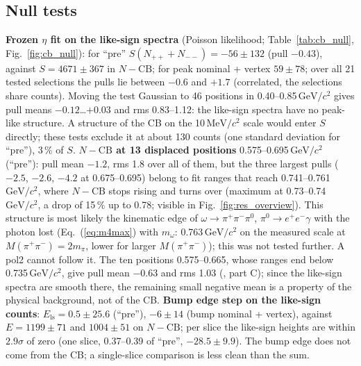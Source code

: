 \documentclass[11pt,a4paper]{article}
\newcommand{\piz}{\ensuremath{\pi^{0}}\xspace}
\newcommand{\ee}{\ensuremath{e^{+}e^{-}}\xspace}
\newcommand{\pipi}{\ensuremath{\pi^{+}\pi^{-}}\xspace}
\newcommand{\Mpipi}{\ensuremath{M(\pi^{+}\pi^{-})}\xspace}
\newcommand{\GeVcc}{\ensuremath{\mathrm{GeV}/c^{2}}\xspace}
\newcommand{\MeVcc}{\ensuremath{\mathrm{MeV}/c^{2}}\xspace}
\newcommand{\code}[1]{\texttt{\detokenize{#1}}}
\begin{document}
\subsection{Null tests}
\label{sec:cbnull}
\textbf{Frozen $\eta$ fit on the like-sign spectra} (Poisson likelihood; Table~\ref{tab:cb_null}, Fig.~\ref{fig:cb_null}):
for ``pre'' $S(N_{++}+N_{--})=-56\pm132$ (pull $-0.43$), against $S=4671\pm367$ in $N-\mathrm{CB}$; for peak nominal + vertex
$59\pm78$; over all 21 tested selections the pulls lie between $-0.6$ and $+1.7$ (correlated, the selections share
counts). Moving the test Gaussian to 46 positions in 0.40--0.85\,\GeVcc gives pull means $-0.12$\dots$+0.03$ and rms
0.83--1.12: the like-sign spectra have no peak-like structure. A structure of the CB on the 10\,\MeVcc scale would
enter $S$ directly; these tests exclude it at about 130 counts (one standard deviation for ``pre''), 3\,\% of $S$.
\textbf{$N-\mathrm{CB}$ at 13 displaced positions} 0.575--0.695\,\GeVcc (``pre''): pull mean $-1.2$, rms 1.8 over all of
them, but the three largest pulls ($-2.5$, $-2.6$, $-4.2$ at 0.675--0.695) belong to fit ranges that reach 0.741--0.761\,\GeVcc,
where $N-\mathrm{CB}$ stops rising and turns over (maximum at 0.73--0.74\,\GeVcc, a drop of 15\,\% up to 0.78; visible in
Fig.~\ref{fig:res_overview}). This structure is most likely the kinematic edge of $\omega\to\pipi\piz$, $\piz\to\ee\gamma$ with
the photon lost (Eq.~(\ref{eq:m4max}) with $m_\omega$: 0.763\,\GeVcc on the measured scale at $\Mpipi=2m_\pi$, lower for larger
\Mpipi); this was not tested further. A pol2 cannot follow it. The ten positions 0.575--0.665, whose ranges end below
0.735\,\GeVcc, give pull mean $-0.63$ and rms 1.03 (\code{tables_exp/fix_checks.txt}, part C); since the like-sign spectra are smooth
there, the remaining small negative mean is a property of the physical background, not of the CB.
\textbf{Bump edge step on the like-sign counts}: $E_{\mathrm{ls}}=0.5\pm25.6$ (``pre''), $-6\pm14$ (bump nominal + vertex),
against $E=1199\pm71$ and $1004\pm51$ on $N-\mathrm{CB}$; per slice the like-sign heights are within $2.9\sigma$ of zero
(one slice, 0.37--0.39 of ``pre'', $-28.5\pm9.9$). The bump edge does not come from the CB; a single-slice
comparison is less clean than the sum.
\end{document}
